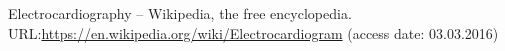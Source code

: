 \documentclass[runningheads]{AIIT}
\begin{document}
%
%
 \begin{thebibliography}{99}
  Electrocardiography -- Wikipedia, the free encyclopedia. URL:\url{https://en.wikipedia.org/wiki/Electrocardiogram} (access date: 03.03.2016)
 \end{thebibliography}


%
%

\end{document}
